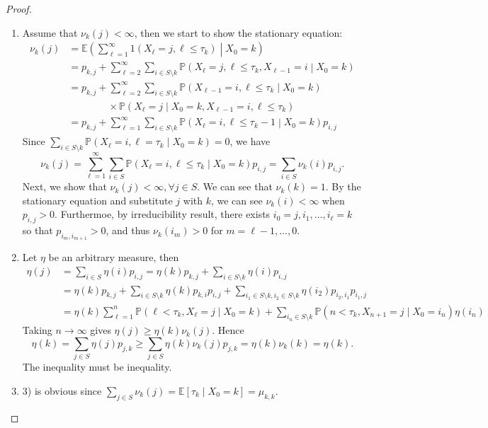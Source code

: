 \begin{proof}
\begin{enumerate}
\item
Assume that $\nu_k(j)<\infty$, then we start to show the stationary equation:
\begin{align*}
\nu_k(j)&=\mathbb{E}\left(
\sum_{\ell=1}^\infty1(X_{\ell}=j, \ell\le \tau_k)\middle| X_0=k
\right)\\
&=p_{k,j}+\sum_{\ell=2}^\infty\sum_{i\in S\setminus k}
\mathbb{P}
\left(
X_{\ell}=j, \ell\le \tau_k, X_{\ell-1}=i\middle| X_0=k
\right)\\
&=p_{k,j}+\sum_{\ell=2}^\infty\sum_{i\in S\setminus k}
\mathbb{P}
\left(
X_{\ell-1}=i, \ell\le \tau_k\middle| X_0=k
\right)\\
&\qquad\qquad\times\mathbb{P}
\left(
X_{\ell}=j\middle| X_0=k,X_{\ell-1}=i, \ell\le \tau_k
\right)\\
&=p_{k,j}+\sum_{\ell=1}^\infty\sum_{i\in S\setminus k}\mathbb{P}
\left(
X_{\ell}=i, \ell\le \tau_k-1\middle| X_0=k
\right)p_{i,j}
\end{align*}
Since $\sum_{i\in S\setminus k}\mathbb{P}
\left(
X_{\ell}=i, \ell= \tau_k\middle| X_0=k
\right)=0$, we have 
\[
\nu_k(j)=\sum_{\ell=1}^\infty\sum_{i\in S}\mathbb{P}
\left(
X_{\ell}=i, \ell\le \tau_k\middle| X_0=k
\right)p_{i,j}=\sum_{i\in S}\nu_k(i)p_{i,j}.
\]
Next, we show that $\nu_k(j)<\infty,\forall j\in S$.
We can see that $\nu_k(k)=1$.
By the stationary equation and substitute $j$ with $k$, 
we can see $\nu_k(i)<\infty$ when $p_{i,j}>0$.
Furthermoe, by irreducibility result, there exists $i_0=j, i_1,\ldots,i_{\ell}=k$ so that $p_{i_m, i_{m+1}}>0$, and thus $\nu_k(i_m)>0$ for $m=\ell-1,\ldots,0$.
\item
Let $\eta$ be an arbitrary measure, then
\begin{align*}
\eta(j)&=\sum_{i\in S}\eta(i)p_{i,j}=\eta(k)p_{k,j}+\sum_{i\in S\setminus k}\eta(i)p_{i,j}\\
&=\eta(k)p_{k,j}+\sum_{i\in S\setminus k}\eta(k)p_{k,i}p_{i,j}+\sum_{i_1\in S\setminus k, i_2\in S\setminus k}\eta(i_2)p_{i_2,i_1}p_{i_1,j}\\
&=\eta(k)\sum_{\ell=1}^n\mathbb{P}(\ell<\tau_k, X_{\ell}=j\mid X_0=k)
+\sum_{i_n\in S\setminus k}\mathbb{P}(n<\tau_k, X_{n+1}=j\mid X_0=i_n)\eta(i_n)
\end{align*}
Taking $n\to\infty$ gives $\eta(j)\ge \eta(k)\nu_k(j)$.
Hence
\[
\eta(k)=
\sum_{j\in S}\eta(j)p_{j,k}\ge \sum_{j\in S}\eta(k)\nu_k(j)p_{j,k}=\eta(k)\nu_k(k)=\eta(k).
\]
The inequality must be inequality.
\item
3) is obvious since $\sum_{j\in S}\nu_k(j)=\mathbb{E}[\tau_k\mid X_0=k]=\mu_{k,k}$.
\end{enumerate}
\end{proof}


